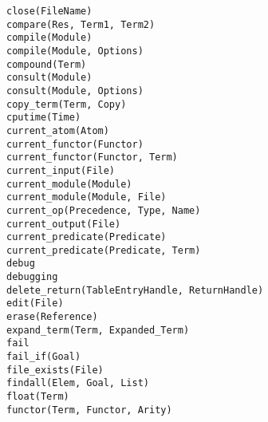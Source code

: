 \begin{tabbing}
 \> {\tt close(FileName)}	\>					\\
 \> {\tt compare(Res, Term1, Term2)} \>					\\
 \> {\tt compile(Module)}	\>					\\
 \> {\tt compile(Module, Options)} \>					\\
 \> {\tt compound(Term)}	\>					\\
 \> {\tt consult(Module)}	\>					\\
 \> {\tt consult(Module, Options)} \>					\\
 \> {\tt copy\_term(Term, Copy)} \>					\\
 \> {\tt cputime(Time)}		\>					\\
 \> {\tt current\_atom(Atom)}	\>				\\
 \> {\tt current\_functor(Functor)} \>				\\
 \> {\tt current\_functor(Functor, Term)} \>				\\
 \> {\tt current\_input(File)}	\>					\\
 \> {\tt current\_module(Module)}	\>				\\
 \> {\tt current\_module(Module, File)}	\>				\\
 \> {\tt current\_op(Precedence, Type, Name)} \>			\\
 \> {\tt current\_output(File)}	\>					\\
 \> {\tt current\_predicate(Predicate)} \>				\\
 \> {\tt current\_predicate(Predicate, Term)} \>			\\
 \> {\tt debug}			\>					\\
 \> {\tt debugging}		\>					\\
 \> {\tt delete\_return(TableEntryHandle, ReturnHandle)}	\>	\\
 \> {\tt edit(File)}		\>					\\
 \> {\tt erase(Reference)}	\>					\\
 \> {\tt expand\_term(Term, Expanded\_Term)} \>				\\
 \> {\tt fail}			\>					\\
 \> {\tt fail\_if(Goal)}	\>					\\
 \> {\tt file\_exists(File)}	\>					\\
 \> {\tt findall(Elem, Goal, List)} \>					\\
 \> {\tt float(Term)}		\>					\\
 \> {\tt functor(Term, Functor, Arity)} \>				\\

\end{tabbing}
